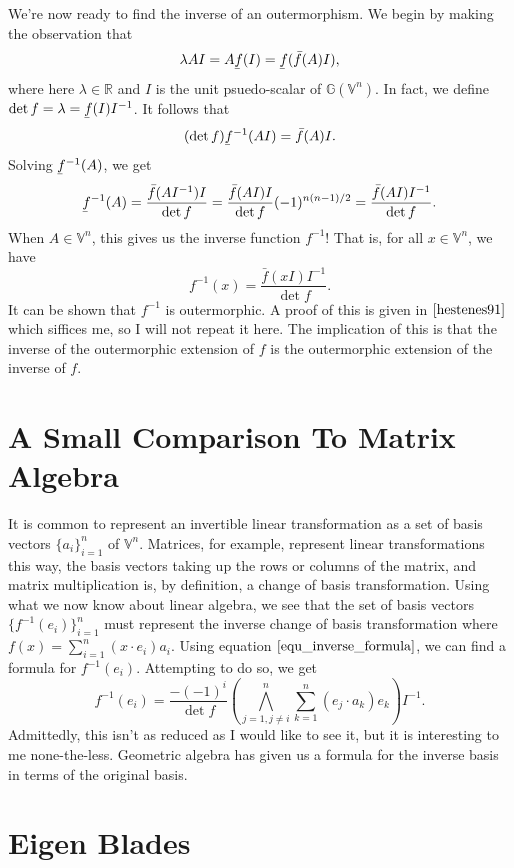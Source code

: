 \documentclass[12pt]{article}
\newcommand{\G}{\mathbb{G}}
\newcommand{\V}{\mathbb{V}}
\newcommand{\R}{\mathbb{R}}
\newcommand{\uf}{\underaccent{\bar}{f}}
\newcommand{\of}{\bar{f}}
\begin{document}
We're now ready to find the inverse of an outermorphism.  We begin by making the
observation that
\begin{equation*}
\lambda AI = A\uf(I) = \uf(\of(A)I),
\end{equation*}
where here $\lambda\in\R$ and $I$ is the unit psuedo-scalar of $\G(\V^n)$.
In fact, we define $\det f=\lambda = \uf(I)I^{-1}$.  It follows that
\begin{equation*}
(\det f)\uf^{-1}(AI) = \of(A)I.
\end{equation*}
Solving $\uf^{-1}(A)$, we get
\begin{equation*}
\uf^{-1}(A) = \frac{\of(AI^{-1})I}{\det f} = \frac{\of(AI)I}{\det f}(-1)^{n(n-1)/2} = \frac{\of(AI)I^{-1}}{\det f}.
\end{equation*}
When $A\in\V^n$, this gives us the inverse function $f^{-1}$!  That is, for all $x\in\V^n$,
we have
\begin{equation}\label{equ_inverse_formula}
f^{-1}(x) = \frac{\of(xI)I^{-1}}{\det f}.
\end{equation}
It can be shown that $f^{-1}$ is outermorphic.
A proof of this is given in $\cite{hestenes91}$ which siffices me, so I will
not repeat it here.
The implication of this is that the inverse of the outermorphic
extension of $f$ is the outermorphic extension of the inverse of $f$.

\section{A Small Comparison To Matrix Algebra}

It is common to represent an invertible linear transformation as a set of basis vectors $\{a_i\}_{i=1}^n$ of $\V^n$.
Matrices, for example, represent linear transformations this way, the basis vectors taking up the rows or
columns of the matrix, and matrix multiplication is, by definition, a
change of basis transformation.  Using what we now know about linear algebra, we see that
the set of basis vectors $\{f^{-1}(e_i)\}_{i=1}^n$ must represent the inverse change of basis transformation
where $f(x)=\sum_{i=1}^n (x\cdot e_i)a_i$.  Using equation $\eqref{equ_inverse_formula}$, we can find
a formula for $f^{-1}(e_i)$.
Attempting to do so, we get
\begin{equation*}
f^{-1}(e_i) = \frac{-(-1)^i}{\det f}\left(\bigwedge_{j=1,j\neq i}^n\sum_{k=1}^n (e_j\cdot a_k)e_k\right)I^{-1}.
\end{equation*}
Admittedly, this isn't as reduced as I would like to see it, but it is interesting to me none-the-less.  Geometric algebra
has given us a formula for the inverse basis in terms of the original basis.

\section{Eigen Blades}




\end{document}
